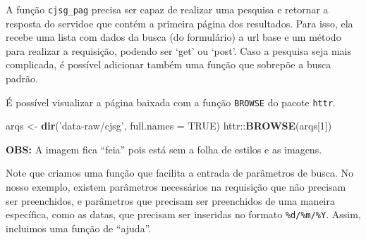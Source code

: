 \documentclass[]{book}
\newenvironment{Shaded}{\begin{snugshade}}{\end{snugshade}}
\newcommand{\KeywordTok}[1]{\textcolor[rgb]{0.13,0.29,0.53}{\textbf{{#1}}}}
\newcommand{\DataTypeTok}[1]{\textcolor[rgb]{0.13,0.29,0.53}{{#1}}}
\newcommand{\DecValTok}[1]{\textcolor[rgb]{0.00,0.00,0.81}{{#1}}}
\newcommand{\StringTok}[1]{\textcolor[rgb]{0.31,0.60,0.02}{{#1}}}
\newcommand{\OtherTok}[1]{\textcolor[rgb]{0.56,0.35,0.01}{{#1}}}
\newcommand{\NormalTok}[1]{{#1}}
\begin{document}
\begin{Shaded}
\end{Shaded}

A função \texttt{cjsg\_pag} precisa ser capaz de realizar uma pesquisa e
retornar a resposta do servidoe que contém a primeira página dos
resultados. Para isso, ela recebe uma lista com dados da busca (do
formulário) a url base e um método para realizar a requisição, podendo
ser `get' ou `post'. Caso a pesquisa seja mais complicada, é possível
adicionar também uma função que sobrepõe a busca padrão.

É possível visualizar a página baixada com a função \texttt{BROWSE} do
pacote \texttt{httr}.

\begin{Shaded}
\begin{Highlighting}[]
\NormalTok{arqs <-}\StringTok{ }\KeywordTok{dir}\NormalTok{(}\StringTok{'data-raw/cjsg'}\NormalTok{, }\DataTypeTok{full.names =} \OtherTok{TRUE}\NormalTok{)}
\NormalTok{httr::}\KeywordTok{BROWSE}\NormalTok{(arqs[}\DecValTok{1}\NormalTok{])}
\end{Highlighting}
\end{Shaded}

\textbf{OBS:} A imagem fica ``feia'' pois está sem a folha de estilos e
as imagens.

Note que criamos uma função que facilita a entrada de parâmetros de
busca. No nosso exemplo, existem parâmetros necessários na requisição
que não precisam ser preenchidos, e parâmetros que precisam ser
preenchidos de uma maneira específica, como as datas, que precisam ser
inseridas no formato \texttt{\%d/\%m/\%Y}. Assim, incluimos uma função
de ``ajuda''.
\end{document}
